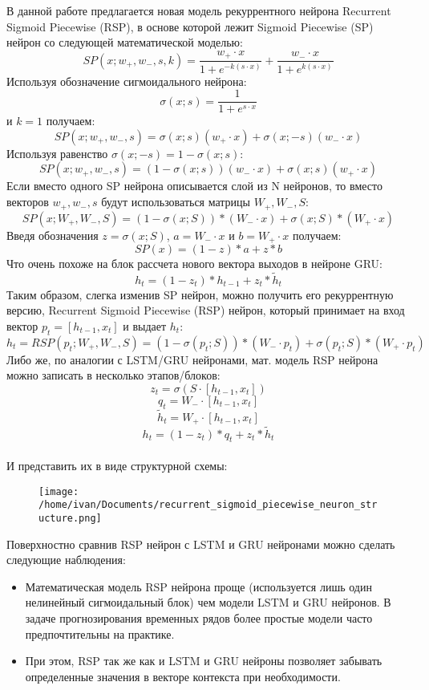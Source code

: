\documentclass[11pt]{article}
\begin{document}
В данной работе предлагается новая модель рекуррентного нейрона Recurrent Sigmoid Piecewise (RSP), в основе которой лежит Sigmoid Piecewise (SP) нейрон со следующей математической моделью:
$$ SP(x;w_+,w_-,s,k)=\frac{w_+ \cdot x}{1 + e^{-k(s \cdot x)}} + \frac{w_- \cdot x}{1 + e^{k(s \cdot x)}} $$
Используя обозначение сигмоидального нейрона:
$$\sigma(x;s)=\frac{1}{1+e^{s \cdot x}}$$
и $k=1$ получаем:
$$ SP(x;w_+,w_-,s)=\sigma(x;s)(w_+ \cdot x) + \sigma(x;-s)(w_- \cdot x) $$
Используя равенство $\sigma(x;-s)=1 - \sigma(x;s)$:
$$ SP(x;w_+,w_-,s) = (1 - \sigma(x;s))(w_- \cdot x) + \sigma(x;s)(w_+ \cdot x) $$
Если вместо одного SP нейрона описывается слой из N нейронов, то вместо векторов $w_+,w_-,s$ будут использоваться матрицы $W_+,W_-,S$:
$$ SP(x;W_+,W_-, S) = (1 - \sigma(x;S)) * (W_- \cdot x) + \sigma(x;S) * (W_+ \cdot x) $$
Введя обозначения $ z = \sigma(x;S) $, $a = W_- \cdot x$ и $b = W_+ \cdot x$ получаем:
$$ SP(x) = (1 - z) * a + z * b $$
Что очень похоже на блок рассчета нового вектора выходов в нейроне GRU:
$$ h_t = (1-z_t)*h_{t-1} + z_t*\tilde{h}_t $$
Таким образом, слегка изменив SP нейрон, можно получить его рекуррентную версию, Recurrent Sigmoid Piecewise (RSP) нейрон, который принимает на вход вектор $p_t=[h_{t-1}, x_t]$ и выдает $h_t$:
$$ h_t=RSP(p_t;W_+,W_-,S) = (1-\sigma(p_t;S))*(W_- \cdot p_t) + \sigma(p_t;S)*(W_+ \cdot p_t) $$
Либо же, по аналогии с LSTM/GRU нейронами, мат. модель RSP нейрона можно записать в несколько этапов/блоков:
$$ z_t = \sigma(S \cdot [h_{t-1}, x_t]) $$
$$ q_t = W_- \cdot [h_{t-1}, x_t] $$
$$ \tilde{h}_t = W_+ \cdot [h_{t-1}, x_t] $$
$$ h_t = (1 - z_t) * q_t + z_t * \tilde{h}_t $$
\\
И представить их в виде структурной схемы:
\\
\begin{figure}[H]
\centering
\texttt{[image: /home/ivan/Documents/recurrent\_sigmoid\_piecewise\_neuron\_structure.png]}
\label{}
\end{figure}

Поверхностно сравнив RSP нейрон с LSTM и GRU нейронами можно сделать следующие наблюдения:
\begin{itemize}
\item Математическая модель RSP нейрона проще (используется лишь один нелинейный сигмоидальный блок) чем модели LSTM и GRU нейронов. В задаче прогнозирования временных рядов более простые модели часто предпочтительны на практике.
\item При этом, RSP так же как и LSTM и GRU нейроны позволяет забывать определенные значения в векторе контекста при необходимости.
 
\end{itemize}
  
\end{document}
